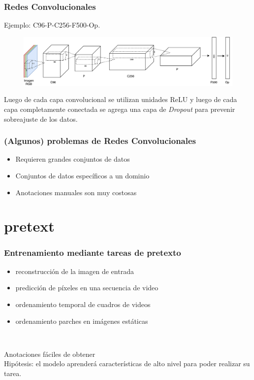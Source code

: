 \documentclass{beamer}
\begin{document}
\begin{frame}[plain]
\frametitle{Redes Convolucionales}
Ejemplo: C96-P-C256-F500-Op.
\vfill
\begin{figure}
    \centering
    \includegraphics[width=\textwidth]{images/net_example.pdf}
\end{figure}
\vfill
Luego de cada capa convolucional se utilizan unidades ReLU y luego de cada capa completamente conectada se agrega una capa de \textit{Dropout} para prevenir sobreajuste de los datos.
\vfill
\end{frame}




\begin{frame}[plain]
\frametitle{(Algunos) problemas de Redes Convolucionales}
\begin{itemize}
    \item Requieren grandes conjuntos de datos
    \item Conjuntos de datos específicos a un dominio
    \item Anotaciones manuales son muy costosas
\end{itemize}
\end{frame}




\section{pretext}
\begin{frame}[plain]
\frametitle{Entrenamiento mediante tareas de pretexto}

\begin{itemize}
    \item reconstrucción de la imagen de entrada
    \item predicción de píxeles en una secuencia de video 
    \item ordenamiento temporal de cuadros de videos
    \item ordenamiento parches en imágenes estáticas
\end{itemize}\\
\vfill

Anotaciones fáciles de obtener\\
\vfill
Hipótesis: el modelo aprenderá características de alto nivel para poder realizar su tarea.
\vfill
\end{frame}
\end{document}
